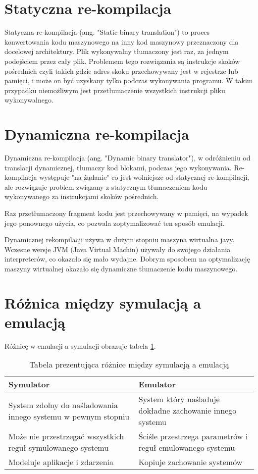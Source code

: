 	\section{Statyczna re-kompilacja}
	Statyczna re-kompilacja (ang. "Static binary translation") to proces konwertowania kodu maszynowego na inny kod maszynowy przeznaczony dla docelowej architektury. Plik wykonywalny tłumaczony jest raz, za jednym podejściem przez cały plik. Problemem tego rozwiązania są instrukcje skoków pośrednich czyli takich gdzie adres skoku przechowywany jest w rejestrze lub pamięci, i może on być uzyskany tylko podczas wykonywania programu. W takim przypadku niemożliwym jest przetłumaczenie wszystkich instrukcji pliku wykonywalnego\cite{uqbt}. 
	
	
	\section{Dynamiczna re-kompilacja}
	Dynamiczna re-kompilacja (ang. "Dynamic binary translator"), w odróżnieniu od translacji dynamicznej, tłumaczy kod blokami, podczas jego wykonywania. Re-kompilacja występuje "na żądanie" co jest wolniejsze od statycznej re-kompilacji, ale rozwiązuje problem związany z statycznym tłumaczeniem kodu wykonywanego za instrukcjami skoków pośrednich.
	
	Raz przetłumaczony fragment kodu jest przechowywany w pamięci, na wypadek jego ponownego użycia, co pozwala zoptymalizować ten sposób emulacji\cite{uqbt}.
	
	
	Dynamicznej rekompilacji używa w dużym stopniu maszyna wirtualna javy. Wczesne wersje JVM (Java Virtual Machin) używały do swojego działania interpreterów, co okazało się mało wydajne. Dobrym sposobem na optymalizację maszyny wirtualnej okazało się dynamiczne tłumaczenie kodu maszynowego\cite{dynamicRecompilationInJava}. 
	
	
	
	\section{Różnica między symulacją a emulacją} 
	Różnicę w emulacji a symulacji obrazuje tabela \ref{table:emulationAndSimulation}.
	
	\begin{table}
		\centering
		\begin{tabular}{ m{7cm} | m{7cm} }
			Symulator &  Emulator  \\ 
			\hline
			System zdolny do naśladowania innego systemu w pewnym stopniu  & System który naśladuje dokładne zachowanie innego systemu \\   
			\hline
			Może nie przestrzegać wszystkich reguł symulowanego systemu & Ściśle przestrzega parametrów i reguł emulowanego systemu \\ 
			\hline
			Modeluje aplikacje i zdarzenia & Kopiuje zachowanie systemów \\ 
		\end{tabular}
		\caption{Tabela prezentująca różnice między symulacją a emulacją \cite{emulationOrSimulation}}
		\label{table:emulationAndSimulation}
	\end{table}
	
